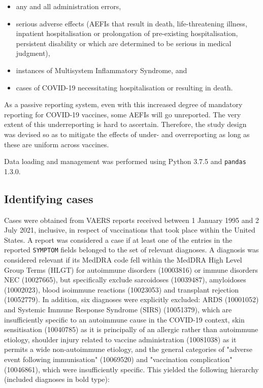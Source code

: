 \documentclass{article}
\begin{document}
\begin{itemize}
    \item any and all administration errors,
    \item serious adverse effects (AEFIs that result in death, life-threatening illness, inpatient hospitalisation or prolongation of pre-existing hospitalisation, persistent disability or which are determined to be serious in medical judgment),
    \item instances of Multisystem Inflammatory Syndrome, and
    \item cases of COVID-19 necessitating hospitalisation or resulting in death.
\end{itemize}

As a passive reporting system, even with this increased degree of mandatory reporting for COVID-19 vaccines, some AEFIs will go unreported.
The very extent of this underreporting is hard to ascertain.\cite{SINGLETON19992908}
Therefore, the study design was devised so as to mitigate the effects of under- and overreporting as long as these are uniform across vaccines.

Data loading and management was performed using Python 3.7.5 and \texttt{pandas} 1.3.0.\cite{mckinney2011pandas}

\subsection{Identifying cases}\label{subsec:identifying-cases}

Cases were obtained from VAERS reports received between 1 January 1995 and 2 July 2021, inclusive, in respect of vaccinations that took place within the United States.
A report was considered a case if at least one of the entries in the reported \texttt{SYMPTOM} fields belonged to the set of relevant diagnoses.
A diagnosis was considered relevant if its MedDRA code fell within the MedDRA High Level Group Terms (HLGT) for autoimmune disorders (10003816) or immune disorders NEC (10027665), but specifically exclude sarcoidoses (10039487), amyloidoses (10002023), blood isoimmune reactions (10023053) and transplant rejection (10052779).
In addition, six diagnoses were explicitly excluded:
ARDS (10001052) and Systemic Immune Response Syndrome (SIRS) (10051379), which are insufficiently specific to an autoimmune cause in the COVID-19 context,
skin sensitisation (10040785) as it is principally of an allergic rather than autoimmune etiology,
shoulder injury related to vaccine administration (10081038) as it permits a wide non-autoimmune etiology, and
the general categories of "adverse event following immunisation" (10069520) and "vaccination complication" (10046861), which were insufficiently specific.
This yielded the following hierarchy (included diagnoses in bold type):
\end{document}
